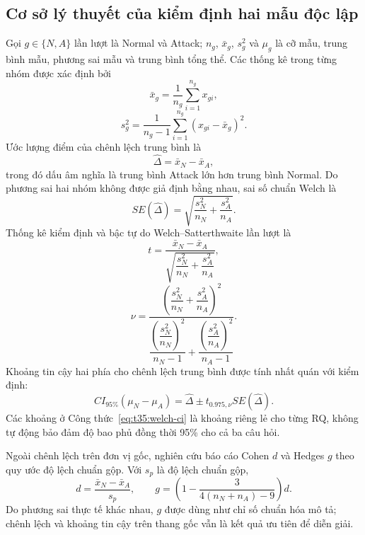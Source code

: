 \documentclass[../main.tex]{subfiles}
\begin{document}
\subsection{Cơ sở lý thuyết của kiểm định hai mẫu độc lập}
\label{sec:t35:theory}

Gọi $g\in\{N,A\}$ lần lượt là Normal và Attack; $n_g$, $\bar{x}_g$, $s_g^2$ và
$\mu_g$ là cỡ mẫu, trung bình mẫu, phương sai mẫu và trung bình tổng thể. Các thống
kê trong từng nhóm được xác định bởi
\begin{equation}
  \bar{x}_g=\frac{1}{n_g}\sum_{i=1}^{n_g}x_{gi},
  \label{eq:t35:mean}
\end{equation}
\begin{equation}
  s_g^2=\frac{1}{n_g-1}\sum_{i=1}^{n_g}(x_{gi}-\bar{x}_g)^2.
  \label{eq:t35:variance}
\end{equation}
Ước lượng điểm của chênh lệch trung bình là
\begin{equation}
  \widehat{\Delta}=\bar{x}_N-\bar{x}_A,
  \label{eq:t35:difference}
\end{equation}
trong đó dấu âm nghĩa là trung bình Attack lớn hơn trung bình Normal. Do phương sai
hai nhóm không được giả định bằng nhau, sai số chuẩn Welch là
\begin{equation}
  SE(\widehat{\Delta})=
  \sqrt{\frac{s_N^2}{n_N}+\frac{s_A^2}{n_A}}.
  \label{eq:t35:welch-se}
\end{equation}
Thống kê kiểm định và bậc tự do Welch--Satterthwaite lần lượt là
\begin{equation}
  t=\frac{\bar{x}_N-\bar{x}_A}
  {\sqrt{\dfrac{s_N^2}{n_N}+\dfrac{s_A^2}{n_A}}},
  \label{eq:t35:welch-t}
\end{equation}
\begin{equation}
  \nu=
  \frac{\left(\dfrac{s_N^2}{n_N}+\dfrac{s_A^2}{n_A}\right)^2}
  {\dfrac{\left(\dfrac{s_N^2}{n_N}\right)^2}{n_N-1}
  +\dfrac{\left(\dfrac{s_A^2}{n_A}\right)^2}{n_A-1}}.
  \label{eq:t35:welch-df}
\end{equation}
Khoảng tin cậy hai phía cho chênh lệch trung bình được tính nhất quán với kiểm định:
\begin{equation}
  CI_{95\%}(\mu_N-\mu_A)=
  \widehat{\Delta}\pm t_{0.975,\nu}SE(\widehat{\Delta}).
  \label{eq:t35:welch-ci}
\end{equation}
Các khoảng ở Công thức~\eqref{eq:t35:welch-ci} là khoảng riêng lẻ cho từng RQ, không tự
động bảo đảm độ bao phủ đồng thời 95\% cho cả ba câu hỏi.

Ngoài chênh lệch trên đơn vị gốc, nghiên cứu báo cáo Cohen $d$ và Hedges $g$ theo quy
ước độ lệch chuẩn gộp. Với $s_p$ là độ lệch chuẩn gộp,
\begin{equation}
  d=\frac{\bar{x}_N-\bar{x}_A}{s_p},\qquad
  g=\left(1-\frac{3}{4(n_N+n_A)-9}\right)d.
  \label{eq:t35:hedges}
\end{equation}
Do phương sai thực tế khác nhau, $g$ được dùng như chỉ số chuẩn hóa mô tả; chênh lệch
và khoảng tin cậy trên thang gốc vẫn là kết quả ưu tiên để diễn giải.
\end{document}
